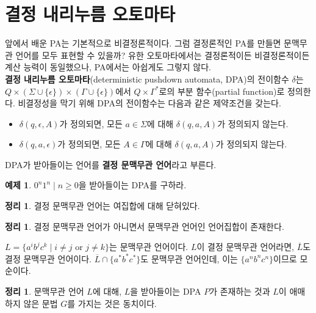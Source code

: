 \documentclass[b5paper, 10pt]{book}
\theoremstyle{definition}
\newtheorem{thm}[defn]{정리}
\newtheorem{ex}[defn]{예제}
\newenvironment{pf*}{\pushQED{\qed}\pf}{\popQED\endpf}
\begin{document}
\section{결정 내리누름 오토마타}
앞에서 배운 PA는 기본적으로 비결정론적이다. 그럼 결정론적인 PA를 만들면 문맥무관 언어를 모두 표현할
수 있을까? 유한 오토마타에서는 결정론적이든 비결정론적이든 계산 능력이 동일했으나, 
PA에서는 아쉽게도 그렇지 않다. \\
\textbf{결정 내리누름 오토마타}(deterministic pushdown automata, DPA)의 전이함수
$\delta$는 $Q \times (\Sigma\cup \{\epsilon\}) \times (\Gamma \cup \{\epsilon\})$에서 
$Q \times \Gamma^*$로의 부분 함수(partial function)로 정의한다. 비결정성을 막기 위해 DPA의
전이함수는 다음과 같은 제약조건을 갖는다. 
\begin{itemize}
    \item $\delta(q,\epsilon,A)$가 정의되면, 모든 $a \in \Sigma$에 대해 $\delta(q,a,A)$가
    정의되지 않는다.
    \item $\delta(q,a,\epsilon)$가 정의되면, 모든 $A \in \Gamma$에 대해 $\delta(q,a,A)$가
    정의되지 않는다. 
\end{itemize}
DPA가 받아들이는 언어를 \textbf{결정 문맥무관 언어}라고 부른다. 
\begin{ex}
    ${0^n1^n \;\vert\; n \ge 0}$을 받아들이는 DPA를 구하라. 
\end{ex}
\begin{thm}
    결정 문맥무관 언어는 여집합에 대해 닫혀있다. 
\end{thm}
\begin{thm}
    결정 문맥무관 언어가 아니면서 문맥무관 언어인 언어집합이 존재한다. 
\end{thm}
\begin{pf*}
    $L = \{ a^ib^jc^k \;\vert\; i \neq j \text{ or } j \neq k \}$는 문맥무관 언어이다.
    $L$이 결정 문맥무관 언어라면, $\overline{L}$도 결정 문맥무관 언어이다. $\overline{L} \cap
    \{a^*b^*c^*\}$도 문맥무관 언어인데, 이는 $\{a^nb^nc^n\}$이므로 모순이다. 
\end{pf*}
\begin{thm}
    문맥무관 언어 $L$에 대해, $L$을 받아들이는 DPA $P$가 존재하는 것과 $L$이 애매하지 않은 문법 
    $G$를 가지는 것은 동치이다. 
\end{thm}
\end{document}
